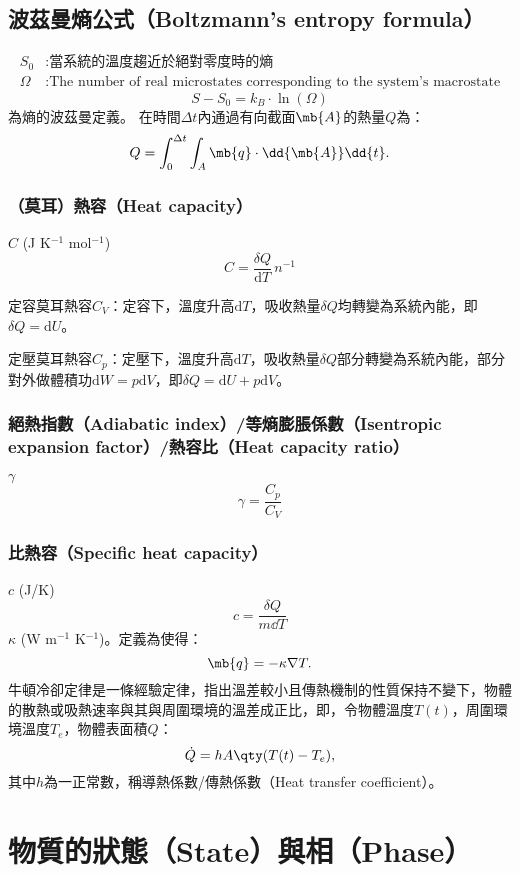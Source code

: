 \documentclass[a4paper,12pt]{report}
\begin{document}
\subsection{波茲曼熵公式（Boltzmann's entropy formula）}
\[\begin{aligned}
S_0&: \text{當系統的溫度趨近於絕對零度時的熵}\\
\Omega&: \text{The number of real microstates corresponding to the system's macrostate}
\end{aligned}\]
\[S-S_0 = k_B \cdot \ln(\Omega)\]
為熵的波茲曼定義。
在時間$\Delta t$內通過有向截面$\mb{A}$的熱量$Q$為：
\[Q=\int_0^{\Delta t}\int_A\mb{q}\cdot\dd{\mb{A}}\dd{t}.\]
\subsubsection{（莫耳）熱容（Heat capacity）}
$C$ (J K$^{-1}$ mol$^{-1}$)
\[C = \frac{\delta Q}{\mathrm{d}T}\,n^{-1}\]
\bit
\item 定容莫耳熱容$C_V$：定容下，溫度升高$\mathrm{d}T$，吸收熱量$\delta Q$均轉變為系統內能，即$\delta Q = \mathrm{d}U$。
\item 定壓莫耳熱容$C_p$：定壓下，溫度升高$\mathrm{d}T$，吸收熱量$\delta Q$部分轉變為系統內能，部分對外做體積功$\mathrm{d}W = p\mathrm{d}V$，即$\delta Q = \mathrm{d}U + p\mathrm{d}V$。
\eit
\subsubsection{絕熱指數（Adiabatic index）/等熵膨脹係數（Isentropic expansion factor）/熱容比（Heat capacity ratio）}
$\gamma$
\[\gamma = \frac{C_p}{C_V}\]
\subsubsection{比熱容（Specific heat capacity）}
$c$ (J/K)
\[c=\frac{\delta Q}{m\dd{T}}\]
$\kappa$ (W m$^{-1}$ K$^{-1}$)。定義為使得：
\[\mb{q}=-\kappa\nabla T.\]
牛頓冷卻定律是一條經驗定律，指出溫差較小且傳熱機制的性質保持不變下，物體的散熱或吸熱速率與其與周圍環境的溫差成正比，即，令物體溫度$T(t)$，周圍環境溫度$T_e$，物體表面積$Q$：
\[\dot{Q}=hA\qty(T(t)-T_e),\]
其中$h$為一正常數，稱導熱係數/傳熱係數（Heat transfer coefficient）。


\section{物質的狀態（State）與相（Phase）}
\end{document}
